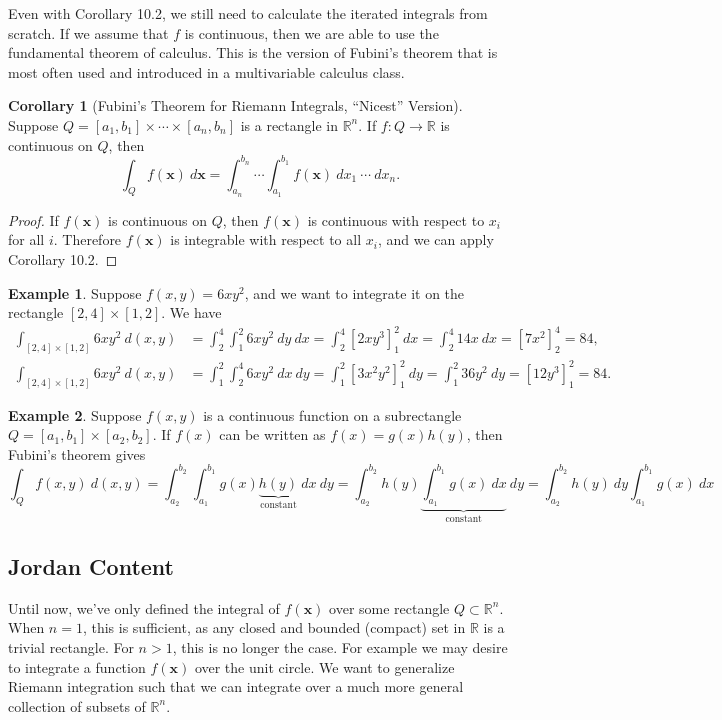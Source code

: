 \documentclass{article}
\newcommand{\R}{\mathbb{R}}
\newcommand{\x}{\mathbf{x}}
\theoremstyle{definition}
\newtheorem{corollary}{Corollary}[section]
\newtheorem{example}{Example}[section]
\begin{document}
Even with Corollary 10.2, we still need to calculate the iterated integrals from scratch. If we assume that $ f $ is continuous, then we are able to use the fundamental theorem of calculus. This is the version of Fubini's theorem that is most often used and introduced in a multivariable calculus class.  

 \begin{corollary}[Fubini's Theorem for Riemann Integrals, ``Nicest'' Version]
	Suppose $ Q= [a_1,b_1]\times \cdots \times [a_n,b_n] $ is a rectangle in $ \R^n $. If $ f:Q\to \R $ is continuous on $ Q $, then 
	$$ \int_Q f(\x)\ d\x = \int_{a_n}^{b_n}\cdots \int_{a_1}^{b_1} f(\x)\ dx_1\ \cdots \ dx_n.$$ 
\end{corollary}
\begin{proof}
	If $ f(\x) $ is continuous on $ Q $, then $ f(\x) $ is continuous with respect to $ x_i $ for all $ i $. Therefore $ f(\x) $ is integrable with respect to all $ x_i $, and we can apply Corollary 10.2.
\end{proof}
\begin{example}
	Suppose $ f(x,y)=6xy^2 $, and we want to integrate it on the rectangle $ [2,4]\times[1,2] $. We have 
	\begin{align*}
		\int_{[2,4]\times [1,2]} 6xy^2\ d(x,y) &= \int_{2}^{4}\int_{1}^{2}6xy^2 \ dy \ dx = \int_{2}^{4}\left[2xy^3\right]_1^2\ dx = \int_{2}^{4}14x \ dx = [7x^2]_2^4 = 84,\\ 
			\int_{[2,4]\times [1,2]} 6xy^2\ d(x,y) & = \int_{1}^{2}\int_{2}^{4}6xy^2 \ dx \ dy = \int_1^2 [3x^2y^2]_1^2 \ dy = \int_{1}^{2}36y^2 \ dy = [12y^3]_1^2 = 84.
	\end{align*}
\end{example}

\begin{example}
	Suppose $ f(x,y) $ is a continuous function on a subrectangle $ Q=[a_1,b_1]\times [a_2,b_2] $. If $ f(x) $ can be written as $ f(x)=g(x)h(y) $, then Fubini's theorem gives 
	$$ \int_Q f(x,y)\ d(x,y) = \int_{a_2}^{b_2}\int_{a_1}^{b_1} g(x)\underbrace{h(y)}_{\text{constant}} \ dx\ dy= \int_{a_2}^{b_2}h(y) \underbrace{\int_{a_1}^{b_1} g(x) \ dx}_{\text{constant}} \ dy = \int_{a_2}^{b_2}h(y) \ dy \int_{a_1}^{b_1} g(x) \ dx$$
\end{example}

	\subsection{Jordan Content}
	
	Until now, we've only defined the integral of $ f(\x) $ over some rectangle $ Q\subset \R^n $. When $ n=1 $, this is sufficient, as any closed and bounded (compact) set in $ \R $ is a trivial rectangle.  For $ n>1 $, this is no longer the case. For example we may desire to integrate a function $ f(\x) $ over the unit circle. We want to generalize Riemann integration such that we can integrate over a much more general collection of subsets of $ \R^n $. 
	
\end{document}
